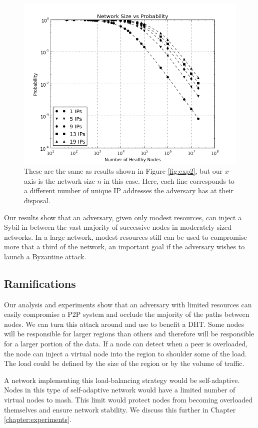 \begin{figure}
	\centering
	\includegraphics[width=0.5\linewidth]{figs/size_prob_all}
	\caption[a]{These are the same as results shown in Figure \ref{fig:exp2}, but our $x$-axis is the network size $n$ in this case.  
		Here, each line corresponds to a different number of unique IP addresses the adversary has at their disposal.}
	\label{fig:size_prob_all}
\end{figure}


Our results show that an adversary, given only modest resources, can inject a Sybil in between the vast majority of successive nodes in moderately sized networks.
In a large network, modest resources still can be used to compromise more that a third of the network, an  important goal if the adversary  wishes to launch a Byzantine attack.

\subsection{Ramifications}
Our analysis and experiments show that an adversary with limited resources can easily compromise a P2P system and occlude the majority of the paths between nodes.
We can turn this attack around and use to benefit a DHT.
Some nodes will be responsible for larger regions than others and therefore will be responsible for a larger portion of the data.
If a node can detect when a peer is overloaded, the node can inject a virtual node into the region to shoulder some of the load.
The load could be defined by the size of the region or by the volume of traffic.

A network implementing this load-balancing strategy would be self-adaptive.
Nodes in this type of self-adaptive network would have a limited number of virtual nodes to mash.
This limit would protect nodes from becoming overloaded themselves and ensure network stability.
We discuss this further in Chapter \ref{chapter:experiments}.

